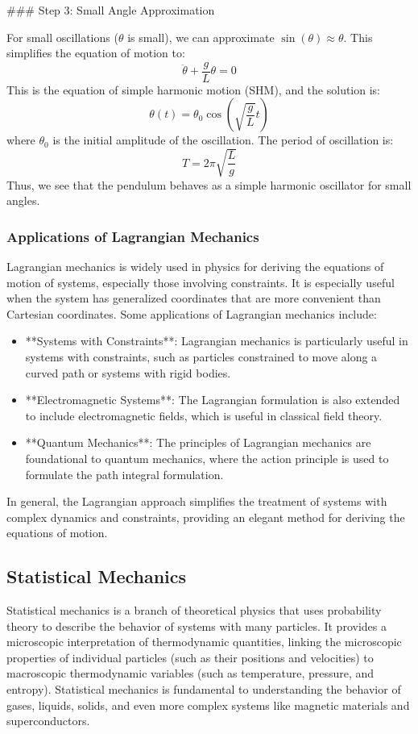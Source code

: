 \documentclass{article}
\begin{document}
### Step 3: Small Angle Approximation

For small oscillations (\( \theta \) is small), we can approximate \( \sin(\theta) \approx \theta \). This simplifies the equation of motion to:
\[
\ddot{\theta} + \frac{g}{L} \theta = 0
\]
This is the equation of simple harmonic motion (SHM), and the solution is:
\[
\theta(t) = \theta_0 \cos\left( \sqrt{\frac{g}{L}} t \right)
\]
where \( \theta_0 \) is the initial amplitude of the oscillation. The period of oscillation is:
\[
T = 2\pi \sqrt{\frac{L}{g}}
\]
Thus, we see that the pendulum behaves as a simple harmonic oscillator for small angles.

\subsubsection*{Applications of Lagrangian Mechanics}

Lagrangian mechanics is widely used in physics for deriving the equations of motion of systems, especially those involving constraints. It is especially useful when the system has generalized coordinates that are more convenient than Cartesian coordinates. Some applications of Lagrangian mechanics include:

\begin{itemize}
    \item **Systems with Constraints**: Lagrangian mechanics is particularly useful in systems with constraints, such as particles constrained to move along a curved path or systems with rigid bodies.
    \item **Electromagnetic Systems**: The Lagrangian formulation is also extended to include electromagnetic fields, which is useful in classical field theory.
    \item **Quantum Mechanics**: The principles of Lagrangian mechanics are foundational to quantum mechanics, where the action principle is used to formulate the path integral formulation.
\end{itemize}

In general, the Lagrangian approach simplifies the treatment of systems with complex dynamics and constraints, providing an elegant method for deriving the equations of motion.

\subsection{Statistical Mechanics}

Statistical mechanics is a branch of theoretical physics that uses probability theory to describe the behavior of systems with many particles. It provides a microscopic interpretation of thermodynamic quantities, linking the microscopic properties of individual particles (such as their positions and velocities) to macroscopic thermodynamic variables (such as temperature, pressure, and entropy). Statistical mechanics is fundamental to understanding the behavior of gases, liquids, solids, and even more complex systems like magnetic materials and superconductors.
\end{document}
